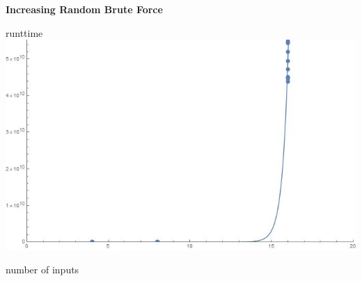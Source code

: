\documentclass[12pt]{report}
\begin{document}
\centerline{\textbf{Increasing Random Brute Force}}
runttime \includegraphics[scale=.5]{increasingbrute.jpg}\\
\centerline{number of inputs}
\\
\end{document}
